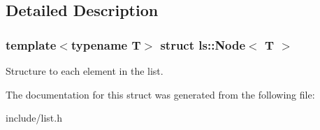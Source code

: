 \subsection{Detailed Description}
\subsubsection*{template$<$typename T$>$\newline
struct ls\+::\+Node$<$ T $>$}

Structure to each element in the list. 

The documentation for this struct was generated from the following file\+:\begin{DoxyCompactItemize}
\item 
include/list.\+h\end{DoxyCompactItemize}
